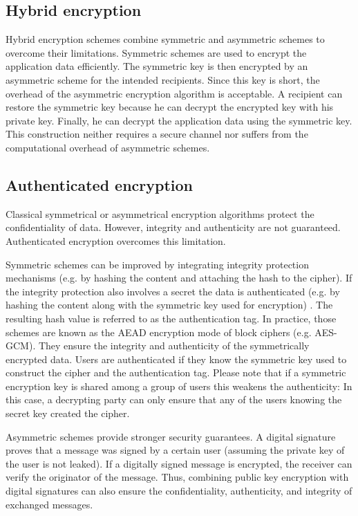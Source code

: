 \documentclass[../main.tex]{subfiles}
\begin{document}
\subsection{Hybrid encryption}
\label{sec:hybrid}
Hybrid encryption schemes combine symmetric and asymmetric schemes to overcome their limitations.
Symmetric schemes are used to encrypt the application data efficiently.
The symmetric key is then encrypted by an asymmetric scheme for the intended recipients.
Since this key is short, the overhead of the asymmetric encryption algorithm is acceptable.
A recipient can restore the symmetric key because he can decrypt the encrypted key with his private key.
Finally, he can decrypt the application data using the symmetric key.
This construction neither requires a secure channel nor suffers from the computational overhead of asymmetric schemes.~\cite{Wolf2007}

\subsection{Authenticated encryption}
\label{sec:aead}
Classical symmetrical or asymmetrical encryption algorithms protect the confidentiality of data.
However, integrity and authenticity are not guaranteed.
Authenticated encryption overcomes this limitation.~\cite{Eckert2018, An2002}

Symmetric schemes can be improved by integrating integrity protection mechanisms (e.g. by hashing the content and attaching the hash to the cipher).
If the integrity protection also involves a secret the data is authenticated (e.g. by hashing the content along with the symmetric key used for encryption) .
The resulting hash value is referred to as the authentication tag.
In practice, those schemes are known as the AEAD encryption mode of block ciphers (e.g. AES-GCM).
They ensure the integrity and authenticity of the symmetrically encrypted data.
Users are authenticated if they know the symmetric key used to construct the cipher and the authentication tag.
Please note that if a symmetric encryption key is shared among a group of users this weakens the authenticity:
In this case, a decrypting party can only ensure that any of the users knowing the secret key created the cipher.~\cite[315]{Eckert2018}

Asymmetric schemes provide stronger security guarantees.
A digital signature proves that a message was signed by a certain user (assuming the private key of the user is not leaked).
If a digitally signed message is encrypted, the receiver can verify the originator of the message.
Thus, combining public key encryption with digital signatures can also ensure the confidentiality, authenticity, and integrity of exchanged messages.~\cite{An2002}
\end{document}
